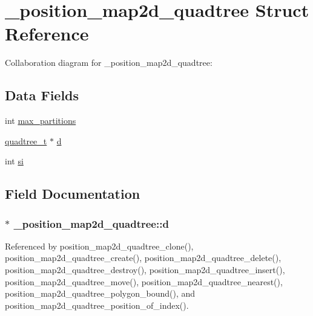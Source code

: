 \hypertarget{struct__position__map2d__quadtree}{}\section{\+\_\+position\+\_\+map2d\+\_\+quadtree Struct Reference}
\label{struct__position__map2d__quadtree}


Collaboration diagram for \+\_\+position\+\_\+map2d\+\_\+quadtree\+:
\subsection*{Data Fields}
\begin{DoxyCompactItemize}
\item 
int \hyperlink{struct__position__map2d__quadtree_a436c7b1585547aaf5240ad3dfc3837ed}{max\+\_\+partitions}
\item 
\hyperlink{quadtree_8h_a2448b8536f876c42956d31e5c111192c}{quadtree\+\_\+t} $\ast$ \hyperlink{struct__position__map2d__quadtree_a01482df118f11dc35348eede88005f21}{d}
\item 
int \hyperlink{struct__position__map2d__quadtree_a52e7c06e1de56215943c9294d5ed4a1b}{si}
\end{DoxyCompactItemize}


\subsection{Field Documentation}
\subsubsection[{\texorpdfstring{d}{d}}]{$\ast$ \+\_\+position\+\_\+map2d\+\_\+quadtree\+::d}\hypertarget{struct__position__map2d__quadtree_a01482df118f11dc35348eede88005f21}{}\label{struct__position__map2d__quadtree_a01482df118f11dc35348eede88005f21}


Referenced by position\+\_\+map2d\+\_\+quadtree\+\_\+clone(), position\+\_\+map2d\+\_\+quadtree\+\_\+create(), position\+\_\+map2d\+\_\+quadtree\+\_\+delete(), position\+\_\+map2d\+\_\+quadtree\+\_\+destroy(), position\+\_\+map2d\+\_\+quadtree\+\_\+insert(), position\+\_\+map2d\+\_\+quadtree\+\_\+move(), position\+\_\+map2d\+\_\+quadtree\+\_\+nearest(), position\+\_\+map2d\+\_\+quadtree\+\_\+polygon\+\_\+bound(), and position\+\_\+map2d\+\_\+quadtree\+\_\+position\+\_\+of\+\_\+index().


